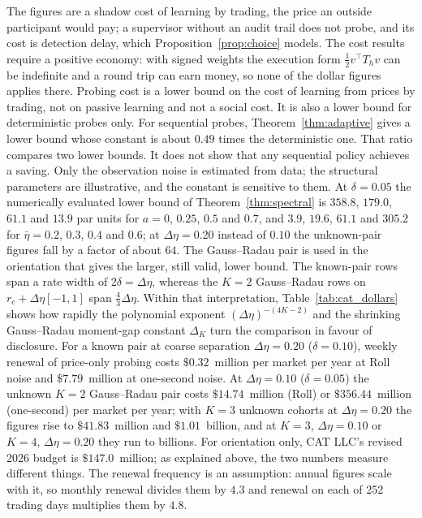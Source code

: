 \documentclass[12pt]{article}
\theoremstyle{definition}
\theoremstyle{remark}
\begin{document}
The figures are a shadow cost of learning by trading, the price an outside participant would pay; a supervisor without an audit trail does not probe, and its cost is detection delay, which Proposition~\ref{prop:choice} models. The cost results require a positive economy: with signed weights the execution form $\tfrac12v^\top T_hv$ can be indefinite and a round trip can earn money, so none of the dollar figures applies there. Probing cost is a lower bound on the cost of learning from prices by trading, not on passive learning and not a social cost. It is also a lower bound for deterministic probes only. For sequential probes, Theorem~\ref{thm:adaptive} gives a lower bound whose constant is about $0.49$ times the deterministic one. That ratio compares two lower bounds. It does not show that any sequential policy achieves a saving. Only the observation noise is estimated from data; the structural parameters are illustrative, and the constant is sensitive to them. At $\delta=0.05$ the numerically evaluated lower bound of Theorem~\ref{thm:spectral} is $358.8$, $179.0$, $61.1$ and $13.9$ par units for $a=0$, $0.25$, $0.5$ and $0.7$, and $3.9$, $19.6$, $61.1$ and $305.2$ for $\bar\eta=0.2$, $0.3$, $0.4$ and $0.6$; at $\Delta\eta=0.20$ instead of $0.10$ the unknown-pair figures fall by a factor of about $64$. The Gauss--Radau pair is used in the orientation that gives the larger, still valid, lower bound. The known-pair rows span a rate width of $2\delta=\Delta\eta$, whereas the $K=2$ Gauss--Radau rows on $r_c+\Delta\eta[-1,1]$ span $\tfrac43\Delta\eta$. Within that interpretation, Table~\ref{tab:cat_dollars} shows how rapidly the polynomial exponent $(\Delta\eta)^{-(4K-2)}$ and the shrinking Gauss--Radau moment-gap constant $\Delta_K$ turn the comparison in favour of disclosure. For a known pair at coarse separation $\Delta\eta=0.20$ ($\delta=0.10$), weekly renewal of price-only probing costs $\$0.32$~million per market per year at Roll noise and $\$7.79$~million at one-second noise. At $\Delta\eta=0.10$ ($\delta=0.05$) the unknown $K=2$ Gauss--Radau pair costs $\$14.74$~million (Roll) or $\$356.44$~million (one-second) per market per year; with $K=3$ unknown cohorts at $\Delta\eta=0.20$ the figures rise to $\$41.83$~million and $\$1.01$~billion, and at $K=3$, $\Delta\eta=0.10$ or $K=4$, $\Delta\eta=0.20$ they run to billions. For orientation only, CAT LLC's revised 2026 budget is $\$147.0$~million; as explained above, the two numbers measure different things. The renewal frequency is an assumption: annual figures scale with it, so monthly renewal divides them by $4.3$ and renewal on each of 252 trading days multiplies them by $4.8$.
\end{document}
